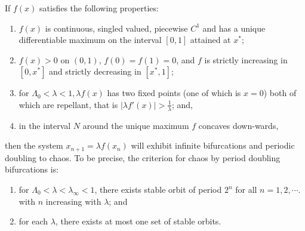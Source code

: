 \begin{thm}\label{th:criteria_for_infinite_bifurcations}
	If $f(x)$ satisfies the following properties:
	\begin{enumerate}
		\item $f(x)$ is continuous, singled valued, piecewise $C^1$ and has a unique differentiable maximum on the interval $[0,1]$ attained at $x^*$;
		\item $f(x) > 0$ on $(0,1)$, $f(0) = f(1) = 0$, and $f$ is strictly increasing in $[0, x^*]$ and strictly decreasing in $[x^*, 1]$;
		\item for $\Lambda_0 < \lambda < 1, \lambda f(x)$ has two fixed points (one of which is $x = 0$) both of which are repellant, that is $|\lambda f'(x)| > \frac{1}{\lambda}$; and,
		\item in the interval $N$ around the unique maximum $f$ concaves down-wards,
	\end{enumerate}
	then the system $x_{n+1} = \lambda f(x_n)$ will exhibit infinite bifurcations and periodic doubling to chaos.
	To be precise, the criterion for chaos by period doubling bifurcations is:
	\begin{enumerate}
		\item for $\Lambda_0 < \lambda < \lambda_{\infty} < 1$, there exists stable orbit of period $2^n$ for all $n = 1, 2, \cdots$. with $n$ increasing with $\lambda$; and
		\item for each $\lambda$, there exists at most one set of stable orbits.
	\end{enumerate}
\end{thm}

